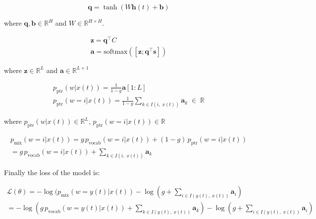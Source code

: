 \begin{equation} \label{eq:query}
		\mathbf{q} = \tanh(W\mathbf{h}(t) + \mathbf{b}) 
\end{equation}

where $\mathbf{q},\mathbf{b} \in \mathbb{R}^{H}$ and $W \in \mathbb{R}^{H \times H}$. 

\begin{equation}
	\begin{gathered}
		\mathbf{z} = \mathbf{q}^{\top} C \\
		\mathbf{a} = \text{softmax}([\mathbf{z}; \mathbf{q}^{\top} \mathbf{s}])
	\end{gathered}
\end{equation}

where $\mathbf{z} \in \mathbb{R}^{L}$ and $\mathbf{a} \in \mathbb{R}^{L+1}$

\begin{equation}
	\begin{gathered}
		p_{\text{ptr}}(w|x(t)) = \frac{1}{1-g}\mathbf{a}[1:L] \\
		p_{\text{ptr}}(w=i|x(t)) = \frac{1}{1-g}\sum_{k \in I(i, \; x(t))}\mathbf{a}_k \; \in \; \mathbb{R}
	\end{gathered}
\end{equation}

where $p_{\text{ptr}}(w|x(t)) \in \mathbb{R}^{L}$, $p_{\text{ptr}}(w=i|x(t)) \in \mathbb{R}$

\begin{equation}
	\begin{gathered}
		p_{\text{mix}}(w=i|x(t)) = g \, p_{\text{vocab}}(w=i|x(t)) + (1-g) \, p_{\text{ptr}}(w=i|x(t)) \\
		= g \, p_{\text{vocab}}(w=i|x(t)) + \sum_{k \in I(i, \; x(t))}\mathbf{a}_k
	\end{gathered}
\end{equation}

Finally the loss of the model is:

\begin{equation}
	\begin{gathered}
		\mathcal{L}(\theta) = -\log(p_{\text{mix}}(w=y(t)|x(t)) -\log(g + \sum_{i \in I(y(t), \; x(t))}\mathbf{a}_i) \\
		= -\log(g \, p_{\text{vocab}}(w=y(t)|x(t)) + \sum_{k \in I(y(t), \; x(t))}\mathbf{a}_k) -\log(g + \sum_{i \in I(y(t), \; x(t))}\mathbf{a}_i)
	\end{gathered}
\end{equation}

